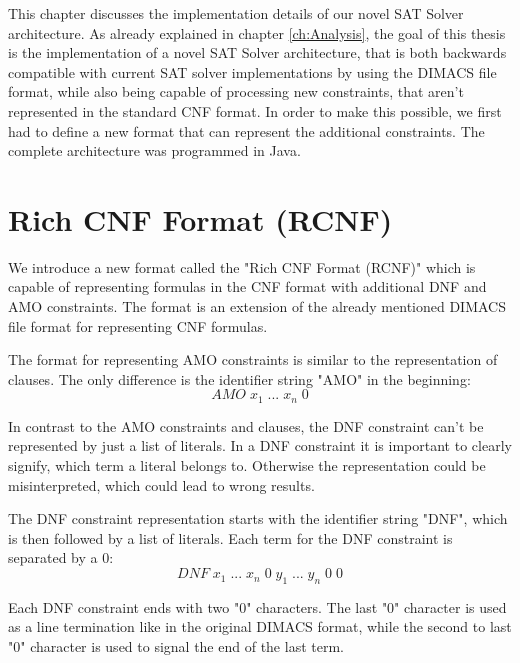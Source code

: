 This chapter discusses the implementation details of our novel SAT Solver architecture. As already explained in chapter \ref{ch:Analysis}, the goal of this thesis is the implementation of a novel SAT Solver architecture, that is both backwards compatible with current SAT solver implementations by using the DIMACS file format, while also being capable of processing new constraints, that aren't represented in the standard CNF format. In order to make this possible, we first had to define a new format that can represent the additional constraints. The complete architecture was programmed in Java.

\section{Rich CNF Format (RCNF)}

We introduce a new format called the "Rich CNF Format (RCNF)" which is capable of representing formulas in the CNF format with additional DNF and AMO constraints. The format is an extension of the already mentioned DIMACS file format for representing CNF formulas.

\begin{leftbar}
The format for representing AMO constraints is similar to the representation of clauses. The only difference is the identifier string "AMO" in the beginning:
\begin{displaymath}
AMO \; x_1 \; ... \; x_n \; 0
\end{displaymath}
\end{leftbar}

In contrast to the AMO constraints and clauses, the DNF constraint can't be represented by just a list of literals. In a DNF constraint it is important to clearly signify, which term a literal belongs to. Otherwise the representation could be misinterpreted, which could lead to wrong results.

\begin{leftbar}
The DNF constraint representation starts with the identifier string "DNF", which is then followed by a list of literals. Each term for the DNF constraint is separated by a 0:
\begin{displaymath}
DNF \; x_1 \; ... \; x_n \; 0 \; y_1 \; ... \; y_n \; 0 \; 0
\end{displaymath}
\end{leftbar}

Each DNF constraint ends with two "0" characters. The last "0" character is used as a line termination like in the original DIMACS format, while the second to last "0" character is used to signal the end of the last term.

